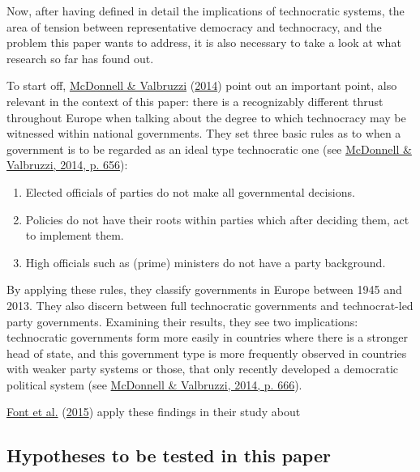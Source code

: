 \documentclass[
  12pt,
  english,
]{article}
\providecommand{\tightlist}{%
  \setlength{\itemsep}{0pt}\setlength{\parskip}{0pt}}
\begin{document}
Now, after having defined in detail the implications of technocratic
systems, the area of tension between representative democracy and
technocracy, and the problem this paper wants to address, it is also
necessary to take a look at what research so far has found out.

To start off, \protect\hyperlink{ref-mcdonnell2014defining}{McDonnell \&
Valbruzzi} (\protect\hyperlink{ref-mcdonnell2014defining}{2014}) point
out an important point, also relevant in the context of this paper:
there is a recognizably different thrust throughout Europe when talking
about the degree to which technocracy may be witnessed within national
governments. They set three basic rules as to when a government is to be
regarded as an ideal type technocratic one (see
\protect\hyperlink{ref-mcdonnell2014defining}{McDonnell \& Valbruzzi,
2014, p. 656}):

\begin{enumerate}
\def\labelenumi{\arabic{enumi}.}
\tightlist
\item
  Elected officials of parties do not make all governmental decisions.
\item
  Policies do not have their roots within parties which after deciding
  them, act to implement them.
\item
  High officials such as (prime) ministers do not have a party
  background.
\end{enumerate}

By applying these rules, they classify governments in Europe between
1945 and 2013. They also discern between full technocratic governments
and technocrat-led party governments. Examining their results, they see
two implications: technocratic governments form more easily in countries
where there is a stronger head of state, and this government type is
more frequently observed in countries with weaker party systems or
those, that only recently developed a democratic political system (see
\protect\hyperlink{ref-mcdonnell2014defining}{McDonnell \& Valbruzzi,
2014, p. 666}).

\protect\hyperlink{ref-font2015participation}{Font et al.}
(\protect\hyperlink{ref-font2015participation}{2015}) apply these
findings in their study about

\hypertarget{hypotheses-to-be-tested-in-this-paper}{%
\subsection{Hypotheses to be tested in this
paper}\label{hypotheses-to-be-tested-in-this-paper}}
\end{document}
